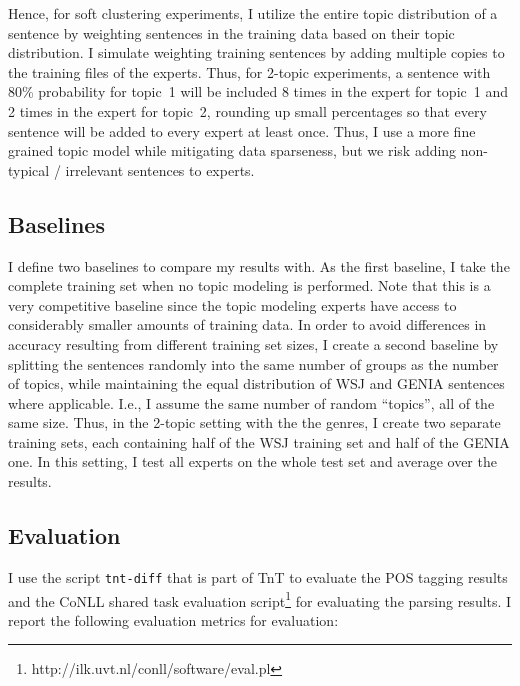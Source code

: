Hence, for soft clustering experiments, I utilize the entire topic distribution of a sentence by weighting sentences in the training data based on their topic distribution. I simulate weighting training sentences by adding multiple copies to the training files of the experts. Thus, for 2-topic experiments, a sentence with 80\% probability for topic~1 will be included 8 times in the expert for topic~1 and 2 times in the expert for topic~2, rounding up small percentages so that every sentence will be added to every expert at least once.  Thus, I use a more fine grained topic model while mitigating data sparseness,  but we risk adding non-typical / irrelevant sentences to experts.

\subsection{Baselines}

I define two baselines to compare my results with. As the first baseline, I take the complete training set when no topic modeling is performed. Note that this is a very competitive baseline since the topic modeling experts have access to considerably smaller amounts of training data.  In order to avoid differences in accuracy resulting from different training set sizes, I create a second baseline by splitting the sentences randomly into the same number of groups as the number of topics, while maintaining the equal distribution of WSJ and GENIA sentences where applicable. I.e., I assume the same number of random ``topics'', all of the same size. Thus, in the 2-topic setting with the the genres, I create two separate training sets, each containing half of the WSJ training set and half of the GENIA one. In this setting, I test all experts on the whole test set and average over the results.

\subsection{Evaluation}

I use the script \texttt{tnt-diff} that is part of TnT to evaluate the POS tagging results  and the CoNLL shared task evaluation script\footnote{http://ilk.uvt.nl/conll/software/eval.pl} for evaluating the parsing results. I report the following evaluation metrics for evaluation:

